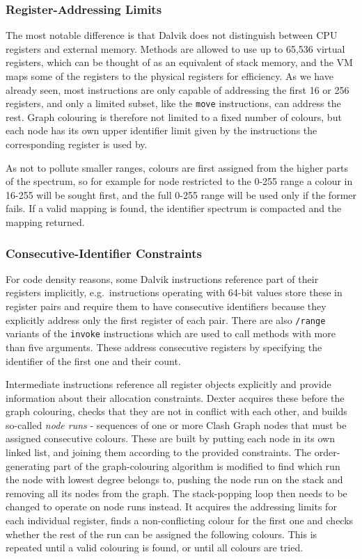 \documentclass[12pt,twoside,notitlepage]{report}
\begin{document}
\subsubsection{Register-Addressing Limits}

The most notable difference is that Dalvik does not distinguish between CPU registers and external memory. Methods are allowed to use up to 65,536 virtual registers, which can be thought of as an equivalent of stack memory, and the VM maps some of the registers to the physical registers for efficiency. As we have already seen, most instructions are only capable of addressing the first 16 or 256 registers, and only a limited subset, like the \verb$move$ instructions, can address the rest. Graph colouring is therefore not limited to a fixed number of colours, but each node has its own upper identifier limit given by the instructions the corresponding register is used by.

As not to pollute smaller ranges, colours are first assigned from the higher parts of the spectrum, so for example for node restricted to the 0-255 range a colour in 16-255 will be sought first, and the full 0-255 range will be used only if the former fails. If a valid mapping is found, the identifier spectrum is compacted and the mapping returned.

\subsubsection{Consecutive-Identifier Constraints}

For code density reasons, some Dalvik instructions reference part of their registers implicitly, e.g.\ instructions operating with 64-bit values store these in register pairs and require them to have consecutive identifiers because they explicitly address only the first register of each pair. There are also \verb$/range$ variants of the \verb$invoke$ instructions which are used to call methods with more than five arguments. These address consecutive registers by specifying the identifier of the first one and their count.

Intermediate instructions reference all register objects explicitly and provide information about their allocation constraints. Dexter acquires these before the graph colouring, checks that they are not in conflict with each other, and builds so-called \emph{node runs} - sequences of one or more Clash Graph nodes that must be assigned consecutive colours. These are built by putting each node in its own linked list, and joining them according to the provided constraints. The order-generating part of the graph-colouring algorithm is modified to find which run the node with lowest degree belongs to, pushing the node run on the stack and removing all its nodes from the graph. The stack-popping loop then needs to be changed to operate on node runs instead. It acquires the addressing limits for each individual register, finds a non-conflicting colour for the first one and checks whether the rest of the run can be assigned the following colours. This is repeated until a valid colouring is found, or until all colours are tried.
\end{document}

